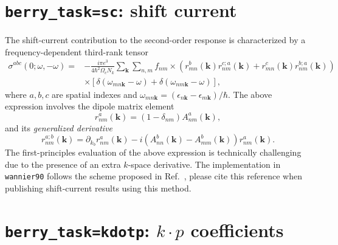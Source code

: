 \section{{\tt berry\_task=sc}: shift current}


The shift-current contribution to the second-order response
is characterized by a frequency-dependent third-rank tensor~\cite{sipe-prb00}
\begin{equation}
\begin{split}
\sigma^{abc}(0;\omega,-\omega)=&-\frac{i\pi e^3}{4\hbar^2 \Omega_c N_k}
\sum_{\bm{k}} \sum_{n,m}f_{nm}
\times
\left(r^b_{ mn}(\bm{k})r^{c;a}_{nm}(\bm{k}) + r^c_{mn}(\bm{k})r^{b;a}_{ nm}(\bm{k})\right)\\
&\times \left[\delta(\omega_{mn\bm{k}}-\omega)+\delta(\omega_{nm\bm{k}}-\omega)\right],
\end{split}
\end{equation}
where $a,b,c$ are spatial indexes
and $\omega_{mn\bm{k}}=(\epsilon_{n\bm{k}}-\epsilon_{m\bm{k}})/\hbar$.
The above expression involves 
the dipole matrix element 
\begin{equation}
\label{eq:r}
r^a_{ nm}(\bm{k})=(1-\delta_{nm})A^a_{ nm}(\bm{k}),
\end{equation}
and its \emph{generalized
derivative}
%
\begin{equation}
\label{eq:gen-der}
r^{a;b}_{nm}(\bm{k})=\partial_{k_{b}} r^a_{nm}(\bm{k})
-i\left(A^b_{nn}(\bm{k})-A^b_{ mm}(\bm{k})\right)r^a_{ nm}(\bm{k}).
\end{equation}
The first-principles evaluation of the
above expression is technically challenging
due to the presence of an extra $k$-space derivative.
The implementation in {\tt wannier90} follows the scheme proposed in Ref.~\cite{ibanez-azpiroz_ab_2018}, 
please cite this reference when publishing shift-current results using this method.


\section{{\tt berry\_task=kdotp}: $k\cdot p$ coefficients}
\label{sec:kdotp}

